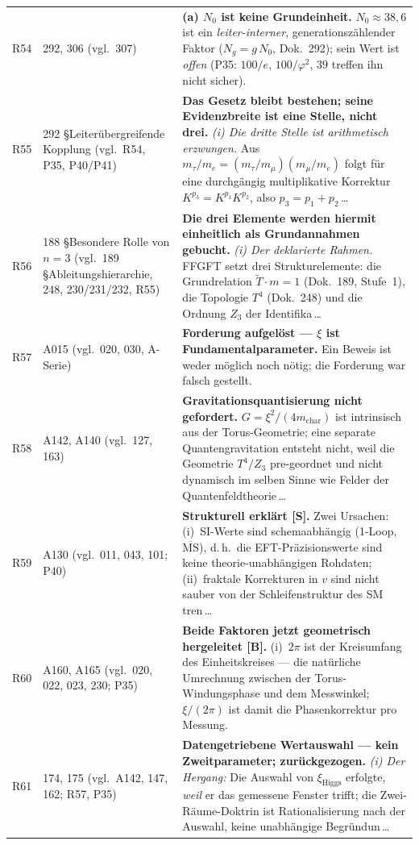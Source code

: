 \begin{longtable}{@{}p{0.9cm}p{3.1cm}p{10.2cm}@{}}
R54 & 292, 306 (vgl.\ 307) & \textbf{(a) $N_0$ ist keine Grundeinheit.} $N_0\approx38{,}6$ ist ein \emph{leiter-interner}, generationszählender Faktor ($N_g=g\,N_0$, Dok.~292); sein Wert ist \emph{offen} (P35: $100/e$, $100/\varphi^2$, $39$ treffen ihn nicht sicher). \\
R55 & 292 \S{}Leiterübergreifende Kopplung (vgl.\ R54, P35, P40/P41) & \textbf{Das Gesetz bleibt bestehen; seine Evidenzbreite ist eine Stelle, nicht drei.} \emph{(i) Die dritte Stelle ist arithmetisch erzwungen.} Aus $m_\tau/m_e=(m_\tau/m_\mu)(m_\mu/m_e)$ folgt für eine durchgängig multiplikative Korrektur $K^{p_3}=K^{p_1}K^{p_2}$, also $p_3=p_1+p_2$\,\ldots \\
R56 & 188 \S{}Besondere Rolle von $n=3$ (vgl.\ 189 \S{}Ableitungshierarchie, 248, 230/231/232, R55) & \textbf{Die drei Elemente werden hiermit einheitlich als Grundannahmen gebucht.} \emph{(i) Der deklarierte Rahmen.} FFGFT setzt drei Strukturelemente: die Grundrelation $\tilde{T}\cdot m = 1$ (Dok.~189, Stufe~1), die Topologie $T^4$ (Dok.~248) und die Ordnung $Z_3$ der Identifika\,\ldots \\
R57 & A015 (vgl.\ 020, 030, A-Serie) & \textbf{Forderung aufgelöst --- $\xi$ ist Fundamentalparameter.} Ein Beweis ist weder möglich noch nötig; die Forderung war falsch gestellt. \\
R58 & A142, A140 (vgl.\ 127, 163) & \textbf{Gravitationsquantisierung nicht gefordert.} $G=\xi^2/(4m_\text{char})$ ist intrinsisch aus der Torus-Geometrie; eine separate Quantengravitation entsteht nicht, weil die Geometrie $T^4/Z_3$ pre-geordnet und nicht dynamisch im selben Sinne wie Felder der Quantenfeldtheorie\,\ldots \\
R59 & A130 (vgl.\ 011, 043, 101; P40) & \textbf{Strukturell erklärt [S].} Zwei Ursachen: (i)~SI-Werte sind schemaabhängig (1-Loop, $\overline{\mathrm{MS}}$), d.\,h.\ die EFT-Präzisionswerte sind keine theorie-unabhängigen Rohdaten; (ii)~fraktale Korrekturen in $v$ sind nicht sauber von der Schleifenstruktur des SM tren\,\ldots \\
R60 & A160, A165 (vgl.\ 020, 022, 023, 230; P35) & \textbf{Beide Faktoren jetzt geometrisch hergeleitet [B].} (i)~$2\pi$ ist der Kreisumfang des Einheitskreises --- die natürliche Umrechnung zwischen der Torus-Windungsphase und dem Messwinkel; $\xi/(2\pi)$ ist damit die Phasenkorrektur pro Messung. \\
R61 & 174, 175 (vgl.\ A142, 147, 162; R57, P35) & \textbf{Datengetriebene Wertauswahl --- kein Zweitparameter; zurückgezogen.} \emph{(i) Der Hergang:} Die Auswahl von $\xi_\text{Higgs}$ erfolgte, \emph{weil} er das gemessene Fenster trifft; die Zwei-Räume-Doktrin ist Rationalisierung nach der Auswahl, keine unabhängige Begründun\,\ldots \\

\end{longtable}
